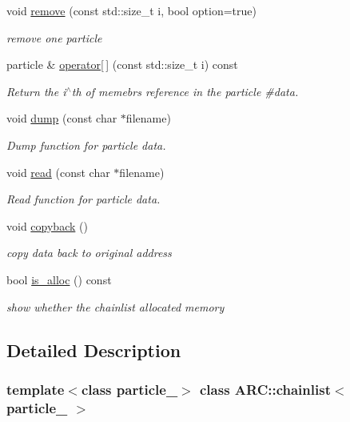 \begin{DoxyCompactItemize}
void \hyperlink{classARC_1_1chainlist_adcf73b53ad0da50299f4ef3f5fefae04}{remove} (const std\+::size\+\_\+t i, bool option=true)
\begin{DoxyCompactList}\small\item\em remove one particle \end{DoxyCompactList}\item 
particle \& \hyperlink{classARC_1_1chainlist_a995cc0dd04b7c6d8e61080db801845c1}{operator\mbox{[}$\,$\mbox{]}} (const std\+::size\+\_\+t i) const
\begin{DoxyCompactList}\small\item\em Return the i$^\wedge$th of memebr\textquotesingle{}s reference in the particle \#data. \end{DoxyCompactList}\item 
void \hyperlink{classARC_1_1chainlist_a4b42fabdc7ff6edca56ce65b316f581f}{dump} (const char $\ast$filename)
\begin{DoxyCompactList}\small\item\em Dump function for particle data. \end{DoxyCompactList}\item 
void \hyperlink{classARC_1_1chainlist_adfa67e2ccdbdfd7ed945fa7617f90ecc}{read} (const char $\ast$filename)
\begin{DoxyCompactList}\small\item\em Read function for particle data. \end{DoxyCompactList}\item 
void \hyperlink{classARC_1_1chainlist_aba70559e1b70882256a7805744e22b25}{copyback} ()
\begin{DoxyCompactList}\small\item\em copy data back to original address \end{DoxyCompactList}\item 
bool \hyperlink{classARC_1_1chainlist_a0e2f35b8eabe9d9ecd77ed9f24e083de}{is\+\_\+alloc} () const
\begin{DoxyCompactList}\small\item\em show whether the chainlist allocated memory \end{DoxyCompactList}\end{DoxyCompactItemize}


\subsection{Detailed Description}
\subsubsection*{template$<$class particle\+\_\+$>$\newline
class A\+R\+C\+::chainlist$<$ particle\+\_\+ $>$}

